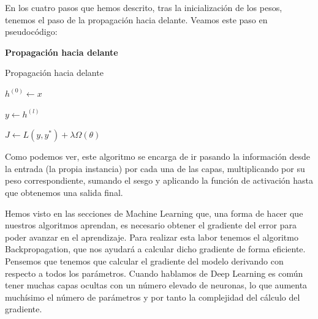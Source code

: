 En los cuatro pasos que hemos descrito, tras la inicialización de los pesos, tenemos el paso de la propagación hacia delante. Veamos este paso en pseudocódigo:

\begin{algorithm}[H]{\Large{\textbf{Propagación hacia delante}}}
	
	\vspace{15px}
	
	\caption{Propagación hacia delante}
	\label{alg:forward-propagation}
	
	\vspace{10px}
	
	$h^{(0)}\leftarrow x$
	

	$y\leftarrow h^{(l)}$
	
	$J\leftarrow L(y,y^*) + \lambda \Omega (\theta)$
	
	\vspace{10px}
	
	
	\vspace{5px}
\end{algorithm}

Como podemos ver, este algoritmo se encarga de ir pasando la información desde la entrada (la propia instancia) por cada una de las capas, multiplicando por su peso correspondiente, sumando el sesgo y aplicando la función de activación hasta que obtenemos una salida final.

Hemos visto en las secciones de Machine Learning que, una forma de hacer que nuestros algoritmos aprendan, es necesario obtener el gradiente del error para poder avanzar en el aprendizaje. Para realizar esta labor tenemos el algoritmo Backpropagation, que nos ayudará a calcular dicho gradiente de forma eficiente. Pensemos que tenemos que calcular el gradiente del modelo derivando con respecto a todos los parámetros. Cuando hablamos de Deep Learning es común tener muchas capas ocultas con un número elevado de neuronas, lo que aumenta muchísimo el número de parámetros y por tanto la complejidad del cálculo del gradiente.


